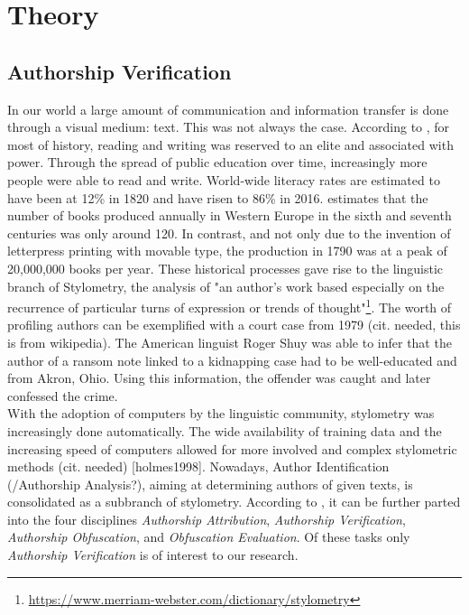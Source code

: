 \chapter{Theory}\label{ch:theory}
\section{Authorship Verification}\label{sec:authorship-verification}
In our world a large amount of communication and information transfer is done through a visual medium: text.
This was not always the case.
According to \cite{owidliteracy}, for most of history, reading and writing was reserved to an elite and associated with power.
Through the spread of public education over time, increasingly more people were able to read and write.
World-wide literacy rates are estimated to have been at 12\% in 1820 and have risen to 86\% in 2016.
\cite{buringh2009charting} estimates that the number of books produced annually in Western Europe in the sixth and seventh centuries was only around 120.
In contrast, and not only due to the invention of letterpress printing with movable type, the production in 1790 was at a peak of 20,000,000 books per year.
These historical processes gave rise to the linguistic branch of Stylometry, the analysis of "an author's work based especially on the recurrence of particular turns of expression or trends of thought"\footnote{\url{https://www.merriam-webster.com/dictionary/stylometry}}.
The worth of profiling authors can be exemplified with a court case from 1979 (cit. needed, this is from wikipedia).
The American linguist Roger Shuy was able to infer that the author of a ransom note linked to a kidnapping case had to be well-educated and from Akron, Ohio.
Using this information, the offender was caught and later confessed the crime.\\
With the adoption of computers by the linguistic community, stylometry was increasingly done automatically.
The wide availability of training data and the increasing speed of computers allowed for more involved and complex stylometric methods (cit. needed) [holmes1998].
Nowadays, Author Identification (/Authorship Analysis?), aiming at determining authors of given texts, is consolidated as a subbranch of stylometry.
According to \cite{bevendorff2020shared}, it can be further parted into the four disciplines \textit{Authorship Attribution}, \textit{Authorship Verification}, \textit{Authorship Obfuscation}, and \textit{Obfuscation Evaluation}.
Of these tasks only \textit{Authorship Verification} is of interest to our research.
